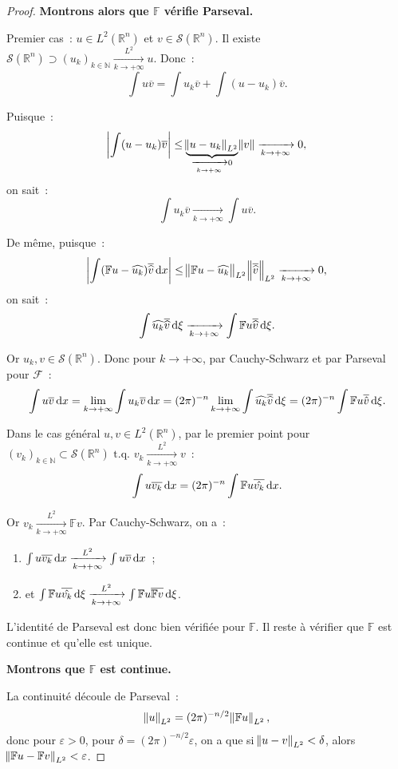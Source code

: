 \documentclass{report}
\newcommand{\R}{{\mathbb R}}
\newcommand{\N}{{\mathbb N}}
\newcommand{\tq}{\text{ t.q. }}
\newcommand{\pinfty}{{+\infty}}
\theoremstyle{definition}
\theoremstyle{remark}
\begin{document}
\begin{proof}
\textbf{Montrons alors que $\mathbb F$  vérifie Parseval.}

Premier cas~: $u \in L^2(\R^n)$ et $v \in \mathcal S(\R^n)$. Il existe $\mathcal S(\R^n) \supset (u_k)_{k \in \N} \xrightarrow[k \to \pinfty]{L^2} u$. Donc~:
\[\int u\overline v = \int u_k\overline v + \int (u-u_k)\overline v.\]

Puisque~:
\[\abs {\int (u-u_k)\overline v} \leq \underbrace {\norm {u-u_k}_{L^2}}_{\xrightarrow[k \to \pinfty]{} 0} \norm v \xrightarrow[k \to \pinfty]{} 0,\]
on sait~:
\[\int u_k\overline v \xrightarrow[k \to \pinfty]{} \int u\overline v.\]

De même, puisque~:
\[\abs {\int (\mathbb Fu - \widehat {u_k})\overline {\widehat v}\dif x} \leq \norm {\mathbb Fu - \widehat {u_k}}_{L^2}\norm {\overline {\widehat v}}_{L^2}
\xrightarrow[k \to \pinfty]{} 0,\]
on sait~:
\[\int \widehat {u_k}\overline {\widehat v}\dif\xi \xrightarrow[k \to \pinfty]{} \int\mathbb Fu\overline {\widehat v}\dif\xi.\]

Or $u_k, v \in \mathcal S(\R^n)$. Donc pour $k \to \pinfty$, par Cauchy-Schwarz et par Parseval pour $\mathcal F$~:
\[\int u\overline v\dif x = \lim_{k \to \pinfty} \int u_k\overline v\dif x = (2\pi)^{-n}\lim_{k \to \pinfty}\int \widehat {u_k}\overline {\widehat v}\dif\xi
= (2\pi)^{-n}\int\mathbb Fu\overline {\hat v}\dif \xi.\]

Dans le cas général $u, v \in L^2(\R^n)$, par le premier point pour $(v_k)_{k \in \N} \subset \mathcal S(\R^n) \tq v_k \xrightarrow[k \to \pinfty]{L^2} v$~:
\[\int u\overline {v_k}\dif x = (2\pi)^{-n}\int \mathbb Fu\overline {\hat {v_k}}\dif x.\]

Or $v_k \xrightarrow[k \to \pinfty]{L^2} \mathbb Fv$. Par Cauchy-Schwarz, on a~:
\begin{enumerate}
	\item $\int u\overline {v_k}\dif x \xrightarrow[k \to \pinfty]{L^2} \int u\overline v\dif x$~;
	\item et $\int \mathbb Fu\overline {\hat {v_k}}\dif \xi \xrightarrow[k \to \pinfty]{L^2} \int \mathbb Fu\overline {\mathbb Fv}\dif\xi$.
\end{enumerate}

L'identité de Parseval est donc bien vérifiée pour $\mathbb F$. Il reste à vérifier que $\mathbb F$ est continue et qu'elle est unique.

\textbf{Montrons que $\mathbb F$ est continue.}

La continuité découle de Parseval~:
\[\norm u_{L^2} = (2\pi)^{-n/2}\norm {\mathbb Fu}_{L^2},\]
donc pour $\varepsilon > 0$, pour $\delta = (2\pi)^{-n/2}\varepsilon$, on a que si $\norm {u-v}_{L^2} < \delta$, alors $\norm {\mathbb Fu - \mathbb Fv}_{L^2} < \varepsilon$.


\end{proof}
\end{document}
